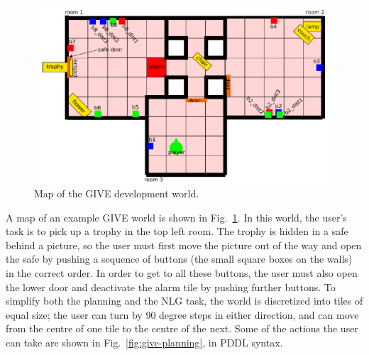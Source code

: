 \begin{figure}
\centering
\includegraphics[width=1 \columnwidth]{give_world_2}
\caption{Map of the GIVE development world.}
  \label{fig:give-development-world}
\end{figure}

A map of an example GIVE world is shown in
Fig.~\ref{fig:give-development-world}.  In this world, the user's task is
to pick up a trophy in the top left room.  The trophy is hidden in a safe
behind a picture, so the user must first move the picture out of the way
and open the safe by pushing a sequence of buttons (the small square boxes
on the walls) in the correct order.  In order to get to all these buttons,
the user must also open the lower door and deactivate the alarm tile by
pushing further buttons.  To simplify both the planning and the NLG task,
the world is discretized into tiles of equal size; the user can turn by 90
degree steps in either direction, and can move from the centre of one tile
to the centre of the next. Some of the actions the user can take are shown
in Fig.~\ref{fig:give-planning}, in PDDL syntax.

